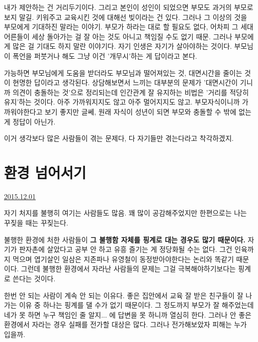 내가 제안하는 건 거리두기이다. 그리고 본인이 성인이 되었으면 부모도 과거의 부모로 보지 말길.
키워주고 교육시킨 것에 대해선 빚이라는 건 있다. 그러나 그 이상의 것을 부모에게 기대하진 말라는 이야기.
부모가 하라는 대로 할 필요도 없다, 어차피 그 세대 어른들이 세상 돌아가는 걸 잘 아는 것도 아니고 책임질 수도 없기 때문.
그러나 부모에게 많은 걸 기대도 하지 말란 이야기다. 자기 인생은 자기가 살아야하는 것이다.
부모님이 폭언을 퍼붓거나 해도 그냥 이건 '개무시'하는 게 답이라고 본다.
\vspace{5mm}

가능하면 부모님에게 도움을 받더라도 부모님과 떨어져있는 것, 대면시간을 줄이는 것이 현명한 답이라고 생각된다.
상담해보면서 느끼는 대부분의 문제가 '대면시간이 기니까 의견이 충돌하는 것'으로 정리되는데
인간관계 잘 유지하는 비법은 '거리를 적당히 유지'하는 것이다. 아주 가까워지지도 않고 아주 멀어지지도 않고.
부모자식이니까 가까워야한다고 보기 좋지만 글쎄, 원래 자식이 성년이 되면 부모와 충돌할 수 밖에 없는 게 정답이 아닌가.
\vspace{5mm}

이거 생각보다 많은 사람들이 겪는 문제다, 다 자기들만 겪는다라고 착각하겠지.
\vspace{5mm}






\section{환경 넘어서기}
\href{https://www.kockoc.com/Apoc/521737}{2015.12.01}

\vspace{5mm}

자기 처지를 불행히 여기는 사람들도 많음.
꽤 많이 공감해주었지만 한편으로는 나는 꾸짖을 때는 꾸짖는다.
\vspace{5mm}

불행한 환경에 처한 사람들이 \textbf{그 불행함 자체를 핑계로 대는 경우도 많기 때문이다.}
자기가 판자촌에 살았다고 공부 안 하고 유흥 즐기는 게 정당화될 수는 없다.
그건 인육까지 먹으며 엽기살인 일삼은 지존파나 유영철이 동정받아야한다는 논리와 똑같기 때문이다.
그런데 불행한 환경에서 자라난 사람들의 문제는 그걸 극복해야하기보다는 핑계로 쓴다는 것이다.
\vspace{5mm}

한번 안 되는 사람이 계속 안 되는 이유다.
좋은 집안에서 교육 잘 받은 친구들이 잘 나가는 이유 중 하나는 핑계를 댈 수가 없기 때문이다.
그 정도까지 부모가 잘 해주었는데 네가 못 하면 누구 책임인 줄 알지... 에 답변을 못 하니까 열심히 한다.
그러나 안 좋은 환경에서 자라는 경우 실패를 전가할 대상은 많다. 그러나 전가해보았자 피해는 누가 입을까.
\vspace{5mm}

